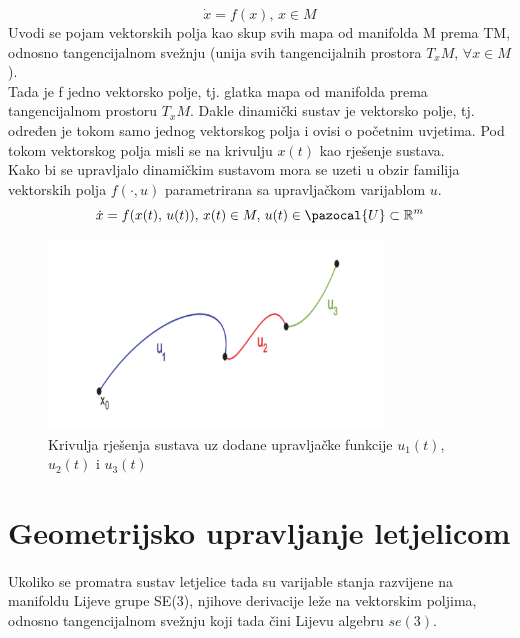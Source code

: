 \documentclass[times, utf8, diplomski]{fer}
\newcommand{\Ua}{\pazocal{U}}
\begin{document}
	\begin{equation}
		\dot{x}=f(x), \, x \in M
	\end{equation}
	Uvodi se pojam vektorskih polja kao skup svih mapa od manifolda M prema TM, odnosno tangencijalnom svežnju (unija svih tangencijalnih prostora $T_xM ,\, \forall x\in M$). \\
	Tada je f jedno vektorsko polje, tj. glatka mapa od manifolda prema tangencijalnom prostoru $T_xM$. Dakle dinamički sustav je vektorsko polje, tj. određen je tokom samo jednog vektorskog polja i ovisi o početnim uvjetima. Pod tokom vektorskog polja misli se na krivulju $x(t)$ kao rješenje sustava. \\
	Kako bi se upravljalo dinamičkim sustavom mora se uzeti u obzir familija vektorskih polja $f(\cdot, u)$ parametrirana sa upravljačkom varijablom $u$. \\
	\begin{equation}
		\dot{x} = f(x(t),\, u(t)), \, x(t)\in M, \, u(t)\in \Ua \subset \mathbb{R}^m
	\end{equation}
	\begin{figure}[h!]
		\includegraphics[width=\textwidth, height=5cm]{krivulja.png}
		\caption{Krivulja rješenja sustava uz dodane upravljačke funkcije $u_1(t)$, $u_2(t)$ i $u_3(t)$}
	\end{figure}
	
	\newpage
	\clearpage
	
	\section{Geometrijsko upravljanje letjelicom}
	\paragraph{}Ukoliko se promatra sustav letjelice tada su varijable stanja razvijene na manifoldu Lijeve grupe SE(3), njihove derivacije leže na vektorskim poljima, odnosno tangencijalnom svežnju koji tada čini Lijevu algebru $se(3)$.
	
\end{document}
